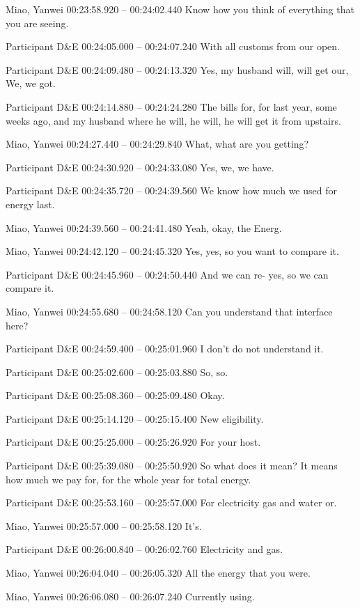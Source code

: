 {Miao, Yanwei 00:23:58.920 -- 00:24:02.440
Know how you think of everything that you are seeing.

Participant D\&E 00:24:05.000 -- 00:24:07.240
With all customs from our open.

Participant D\&E 00:24:09.480 -- 00:24:13.320
Yes, my husband will, will get our, We, we got.

Participant D\&E 00:24:14.880 -- 00:24:24.280
The bills for, for last year, some weeks ago, and my husband where he will, he will, he will get it from upstairs.

Miao, Yanwei 00:24:27.440 -- 00:24:29.840
What, what are you getting?

Participant D\&E 00:24:30.920 -- 00:24:33.080
Yes, we, we have.

Participant D\&E 00:24:35.720 -- 00:24:39.560
We know how much we used for energy last.

Miao, Yanwei 00:24:39.560 -- 00:24:41.480
Yeah, okay, the Energ.

Miao, Yanwei 00:24:42.120 -- 00:24:45.320
Yes, yes, so you want to compare it.

Participant D\&E 00:24:45.960 -- 00:24:50.440
And we can re- yes, so we can compare it.

Miao, Yanwei 00:24:55.680 -- 00:24:58.120
Can you understand that interface here?

Participant D\&E 00:24:59.400 -- 00:25:01.960
I don't do not understand it.

Participant D\&E 00:25:02.600 -- 00:25:03.880
So, so.

Participant D\&E 00:25:08.360 -- 00:25:09.480
Okay.

Participant D\&E 00:25:14.120 -- 00:25:15.400
New eligibility.

Participant D\&E 00:25:25.000 -- 00:25:26.920
For your host.

Participant D\&E 00:25:39.080 -- 00:25:50.920
So what does it mean? It means how much we pay for, for the whole year for total energy.

Participant D\&E 00:25:53.160 -- 00:25:57.000
For electricity gas and water or.

Miao, Yanwei 00:25:57.000 -- 00:25:58.120
It's.

Participant D\&E 00:26:00.840 -- 00:26:02.760
Electricity and gas.

Miao, Yanwei 00:26:04.040 -- 00:26:05.320
All the energy that you were.

Miao, Yanwei 00:26:06.080 -- 00:26:07.240
Currently using.

}

